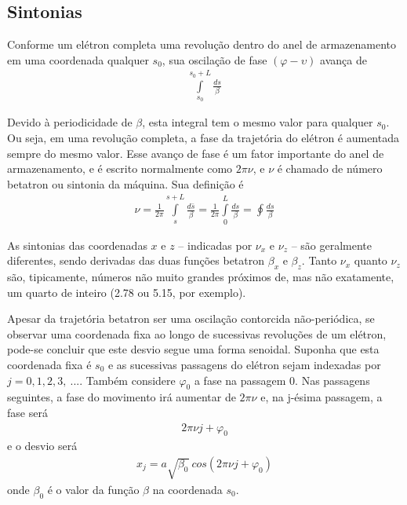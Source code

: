 \subsection{Sintonias}
Conforme um elétron completa uma revolução dentro do anel de armazenamento em uma coordenada qualquer $s_0$, sua oscilação de fase $(\varphi - \upsilon)$ avança de
\begin{align}
	\int\limits_{s_0}^{s_0+L}\frac{ds}{\beta}
\end{align}

Devido à periodicidade de $\beta$, esta integral tem o mesmo valor para qualquer $s_0$. Ou seja, em uma revolução completa, a fase da trajetória do elétron é aumentada sempre do mesmo valor. Esse avanço de fase é um fator importante do anel de armazenamento, e é escrito normalmente como $2\pi \nu$, e $\nu$ é chamado de número betatron ou sintonia da máquina. Sua definição é
\begin{align}
	\nu = \frac{1}{2 \pi}\int\limits_{s}^{s+L}\frac{d\bar{s}}{\beta} = \frac{1}{2 \pi}\int\limits_{0}^{L}\frac{ds}{\beta} = \oint \frac{ds}{\beta}\label{eq:2.60}
\end{align}

As sintonias das coordenadas $x$ e $z$ -- indicadas por $\nu_x$ e $\nu_z$ -- são geralmente diferentes, sendo derivadas das duas funções betatron $\beta_x$ e $\beta_z$. Tanto $\nu_x$ quanto $\nu_z$ são, tipicamente, números não muito grandes próximos de, mas não exatamente, um quarto de inteiro (2.78 ou 5.15, por exemplo). 

Apesar da trajetória betatron ser uma oscilação contorcida não-periódica, se observar uma coordenada fixa ao longo de sucessivas revoluções de um elétron, pode-se concluir que este desvio segue uma forma senoidal. Suponha que esta coordenada fixa é $s_0$ e as sucessivas passagens do elétron sejam indexadas por $j=0,1,2,3,\ ...$. Também considere $\varphi_0$ a fase na passagem 0. Nas passagens seguintes, a fase do movimento irá aumentar de $2\pi\nu$ e, na j-ésima passagem, a fase será
\begin{align}
	2\pi\nu j+ \varphi_0
\end{align}
e o desvio será
\begin{align}
	x_j = a\sqrt{\beta_0}\ cos(2\pi\nu j+ \varphi_0)\label{eq:2.61}
\end{align}
onde $\beta_0$ é o valor da função $\beta$ na coordenada $s_0$.

